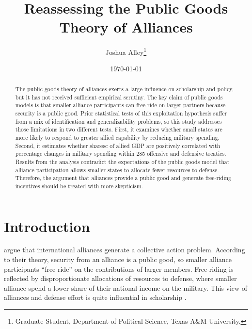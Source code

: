 \documentclass[12pt]{article}
\title{
\textbf{Reassessing the Public Goods Theory of Alliances}
	}
\author{Joshua Alley\footnote{Graduate Student,
Department of Political Science, Texas A\&M University.}}
\date{{\normalsize \today}}
\begin{document}
\maketitle 

\doublespace

\begin{abstract}
The public goods theory of alliances exerts a large influence on scholarship and policy, but it has not received sufficient empirical scrutiny. 
The key claim of public goods models is that smaller alliance participants can free-ride on larger partners because security is a public good. 
Prior statistical tests of this exploitation hypothesis suffer from a mix of identification and generalizability problems, so this study addresses those limitations in two different tests. 
First, it examines whether small states are more likely to respond to greater allied capability by reducing military spending. 
Second, it estimates whether sharesc of allied GDP are positively correlated with percentage changes in military spending within 285 offensive and defensive treaties. 
Results from the analysis contradict the expectations of the public goods model that alliance participation allows smaller states to allocate fewer resources to defense. 
Therefore, the argument that alliances provide a public good and generate free-riding incentives should be treated with more skepticism. 

\end{abstract} 

\newpage


\section{Introduction}



\citet{OlsonZeckhauser1966} argue that international alliances generate a collective action problem. 
According to their theory, security from an alliance is a public good, so smaller alliance participants ``free ride'' on the contributions of larger members. 
Free-riding is reflected by disproportionate allocations of resources to defense, where smaller alliance spend a lower share of their national income on the military.
This view of alliances and defense effort is quite influential in scholarship \citep{Walt1990, Mearsheimer1994, Goldstein1995, SandlerHartley2001, Garfinkel2004, Walt2009, Norrlof2010, Barrett2010, PluemperNeumayer2015}. 
\end{document}
